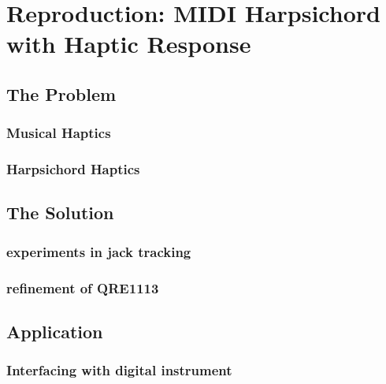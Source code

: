 %
%
%
\chapter{Reproduction: MIDI Harpsichord with Haptic
Response}\label{reproduction-midi-harpsichord-with-haptic-response}

\section{The Problem}\label{the-problem-3}

\subsection{Musical Haptics}\label{musical-haptics}

\subsection{Harpsichord Haptics}\label{harpsichord-haptics}

\section{The Solution}\label{the-solution-2}

\subsection{experiments in jack
tracking}\label{experiments-in-jack-tracking}

\subsection{refinement of QRE1113}\label{refinement-of-qre1113}

\section{Application}\label{application-2}

\subsection{Interfacing with digital
instrument}\label{interfacing-with-digital-instrument}


